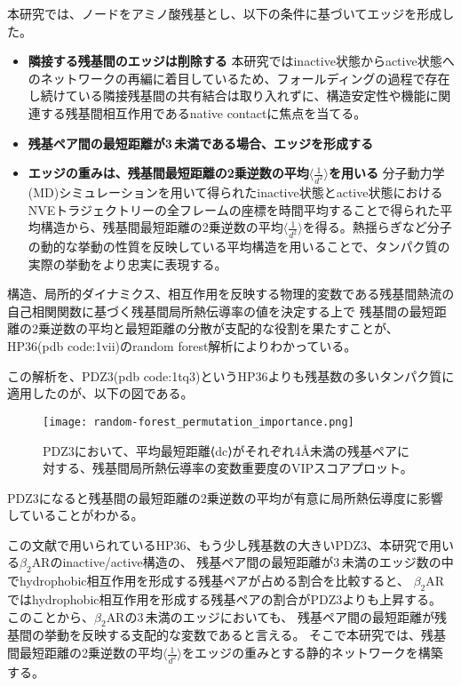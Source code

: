 本研究では、ノードをアミノ酸残基とし、以下の条件に基づいてエッジを形成した。
\begin{itemize}
    \item \textbf{隣接する残基間のエッジは削除する}  
    本研究ではinactive状態からactive状態へのネットワークの再編に着目しているため、フォールディングの過程で存在し続けている隣接残基間の共有結合は取り入れずに、構造安定性や機能に関連する残基間相互作用であるnative contactに焦点を当てる。
    \item \textbf{残基ペア間の最短距離が3\,\text{\AA}未満である場合、エッジを形成する}  
    \item \textbf{エッジの重みは、残基間最短距離の2乗逆数の平均$\langle \frac{1}{d^2} \rangle$を用いる}  
    分子動力学(MD)シミュレーションを用いて得られたinactive状態とactive状態におけるNVEトラジェクトリーの全フレームの座標を時間平均することで得られた平均構造から、残基間最短距離の2乗逆数の平均$\langle \frac{1}{d^2} \rangle$を得る。熱揺らぎなど分子の動的な挙動の性質を反映している平均構造を用いることで、タンパク質の実際の挙動をより忠実に表現する。    
  \end{itemize}

構造、局所的ダイナミクス、相互作用を反映する物理的変数である残基間熱流の自己相関関数に基づく残基間局所熱伝導率の値を決定する上で
残基間の最短距離の2乗逆数の平均と最短距離の分散が支配的な役割を果たすことが、
HP36(pdb code:1vii)のrandom forest解析によりわかっている\cite{Wang2024}。

この解析を、PDZ3(pdb code:1tq3)というHP36よりも残基数の多いタンパク質に適用したのが、以下の図である。

\begin{figure}[htbp]
    \centering
    \texttt{[image: random-forest\_permutation\_importance.png]}
    \caption{PDZ3において、平均最短距離⟨dc⟩がそれぞれ4Å未満の残基ペアに対する、残基間局所熱伝導率の変数重要度のVIPスコアプロット。}
    \label{fig:random_forest}
\end{figure}

\newpage

PDZ3になると残基間の最短距離の2乗逆数の平均が有意に局所熱伝導度に影響していることがわかる。

この文献で用いられているHP36、もう少し残基数の大きいPDZ3、本研究で用いる$\beta_2$ARのinactive/active構造の、
残基ペア間の最短距離が3\,\text{\AA}未満のエッジ数の中でhydrophobic相互作用を形成する残基ペアが占める割合を比較すると、
$\beta_2$ARではhydrophobic相互作用を形成する残基ペアの割合がPDZ3よりも上昇する。
このことから、$\beta_2$ARの3\,\text{\AA}未満のエッジにおいても、
残基ペア間の最短距離が残基間の挙動を反映する支配的な変数であると言える。
そこで本研究では、残基間最短距離の2乗逆数の平均$\langle \frac{1}{d^2} \rangle$をエッジの重みとする静的ネットワークを構築する。

